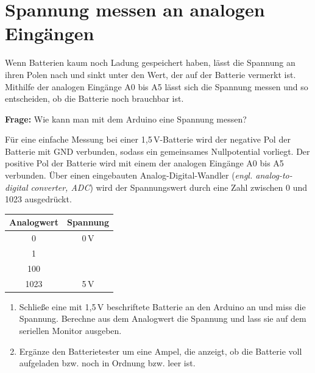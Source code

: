 \documentclass[ngerman, 11pt]{scrreprt}
\begin{document}
	
	\section*{Spannung messen an analogen Eingängen}
	
	Wenn Batterien kaum noch Ladung gespeichert haben, lässt die Spannung an ihren Polen nach und sinkt unter den Wert, der auf der Batterie vermerkt ist. Mithilfe der analogen Eingänge A0 bis A5 lässt sich die Spannung messen und so entscheiden, ob die Batterie noch brauchbar ist.
	
	\begin{ziel}
		\textbf{Frage:} Wie kann man mit dem Arduino eine Spannung messen?
	\end{ziel}
	
	\begin{projekt*}[Batterietester ($U<5\,V$)]
		\begin{minipage}{\textwidth}
			\begin{minipage}{0.68\textwidth}
				Für eine einfache Messung bei einer 1,5\,V-Batterie wird der negative Pol der Batterie mit GND verbunden, sodass ein gemeinsames Nullpotential vorliegt. Der positive Pol der Batterie wird mit einem der analogen Eingänge A0 bis A5 verbunden. Über einen eingebauten Analog-Digital-Wandler (\emph{engl. analog-to-digital converter, ADC}) wird der Spannungswert durch eine Zahl zwischen 0 und 1023 ausgedrückt.
			\end{minipage}
			\hfill
			\begin{minipage}{0.3\textwidth}
				\centering
				\begin{tabular}{c | c}
					\textbf{Analogwert} & \textbf{Spannung} \\ \hline
					0 & 0\,V \\ \hline
					1 &  \\ \hline
					100 &  \\ \hline
					1023 & 5\,V \\ \hline
				\end{tabular}
			\end{minipage}
		\end{minipage}
		\begin{enumerate}[label=\alph*), itemsep=0mm, parsep=0mm]
			\item Schließe eine mit 1,5\,V beschriftete Batterie an den Arduino an und miss die Spannung. Berechne aus dem Analogwert die Spannung und lass sie auf dem seriellen Monitor ausgeben.
			\item Ergänze den Batterietester um eine Ampel, die anzeigt, ob die Batterie voll aufgeladen bzw. noch in Ordnung bzw. leer ist.
		\end{enumerate}	
	\end{projekt*}
	
\end{document}
